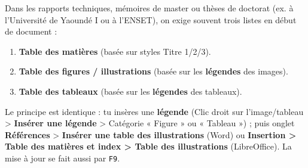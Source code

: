 \documentclass[11pt]{article}
\begin{document}
\begin{savaistu}
Dans les rapports techniques, mémoires de master ou thèses de doctorat (ex. à l'Université de Yaoundé I ou à l'ENSET), on exige souvent trois listes en début de document :
\begin{enumerate}
    \item \textbf{Table des matières} (basée sur styles Titre 1/2/3).
    \item \textbf{Table des figures / illustrations} (basée sur les \textbf{légendes} des images).
    \item \textbf{Table des tableaux} (basée sur les \textbf{légendes} des tableaux).
\end{enumerate}
Le principe est identique : tu insères une \textbf{légende} (Clic droit sur l'image/tableau > \textbf{Insérer une légende} > Catégorie « Figure » ou « Tableau ») ; puis onglet \textbf{Références} > \textbf{Insérer une table des illustrations} (Word) ou \textbf{Insertion > Table des matières et index > Table des illustrations} (LibreOffice). La mise à jour se fait aussi par \texttt{F9}.
\end{savaistu}
\end{document}
